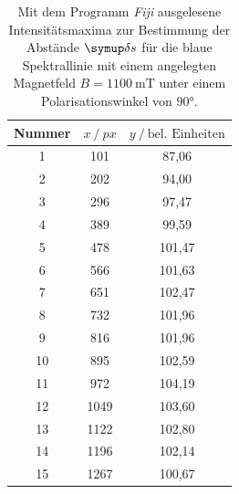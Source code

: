 \begin{table}[H]
  \centering
  \caption{Mit dem Programm \textit{Fiji} \cite{Fiji} ausgelesene Intensitätsmaxima zur Bestimmung der Abstände $\deltaup s$ für die blaue Spektrallinie mit einem angelegten Magnetfeld $B=\SI{1100}{\milli\tesla}$ unter einem Polarisationswinkel von $90°$.}
  \label{tab:277-Max}
  \begin{tabular}{c|cc}
    \toprule
    {Nummer} & {$x \:/\: \si{px}$} & {$y \:/\: \text{bel. Einheiten}$}\\
    \midrule
 1 &  101  &	 87,06 \\
 2 &  202  &	 94,00 \\
 3 &  296  &	 97,47 \\
 4 &  389  &	 99,59 \\
 5 &  478  &	 101,47 \\
 6 &  566  &	 101,63 \\
 7 &  651  &	 102,47 \\
 8 &  732  &	 101,96\\
 9 &  816  &   101,96 \\
10 &  895  &	 102,59 \\
11 &  972  &	 104,19 \\
12 &  1049 &	 103,60 \\
13 &  1122 &	 102,80 \\
14 &  1196 &	 102,14 \\
15 &  1267 &	 100,67 \\
  \end{tabular}
\end{table}

